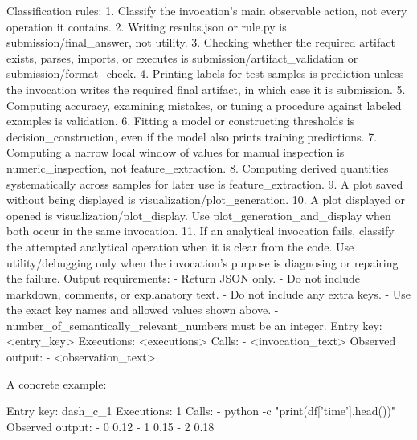 \documentclass[11pt]{article}
\begin{document}
\begin{DocCode}
Classification rules:
1. Classify the invocation's main observable action, not every operation it contains.
2. Writing results.json or rule.py is submission/final_answer, not utility.
3. Checking whether the required artifact exists, parses, imports, or executes is
   submission/artifact_validation or submission/format_check.
4. Printing labels for test samples is prediction unless the invocation writes the
   required final artifact, in which case it is submission.
5. Computing accuracy, examining mistakes, or tuning a procedure against labeled
   examples is validation.
6. Fitting a model or constructing thresholds is decision_construction, even if the
   model also prints training predictions.
7. Computing a narrow local window of values for manual inspection is
   numeric_inspection, not feature_extraction.
8. Computing derived quantities systematically across samples for later use is
   feature_extraction.
9. A plot saved without being displayed is visualization/plot_generation.
10. A plot displayed or opened is visualization/plot_display. Use
    plot_generation_and_display when both occur in the same invocation.
11. If an analytical invocation fails, classify the attempted analytical operation
    when it is clear from the code. Use utility/debugging only when the invocation's
    purpose is diagnosing or repairing the failure.
Output requirements:
- Return JSON only.
- Do not include markdown, comments, or explanatory text.
- Do not include any extra keys.
- Use the exact key names and allowed values shown above.
- number_of_semantically_relevant_numbers must be an integer.
Entry key: <entry_key>
Executions: <executions>
Calls:
- <invocation_text>
Observed output:
- <observation_text>
\end{DocCode}

A concrete example:

\begin{DocCode}
Entry key: dash_c_1
Executions: 1
Calls:
- python -c "print(df['time'].head())"
Observed output:
- 0    0.12
- 1    0.15
- 2    0.18
\end{DocCode}
\end{document}
